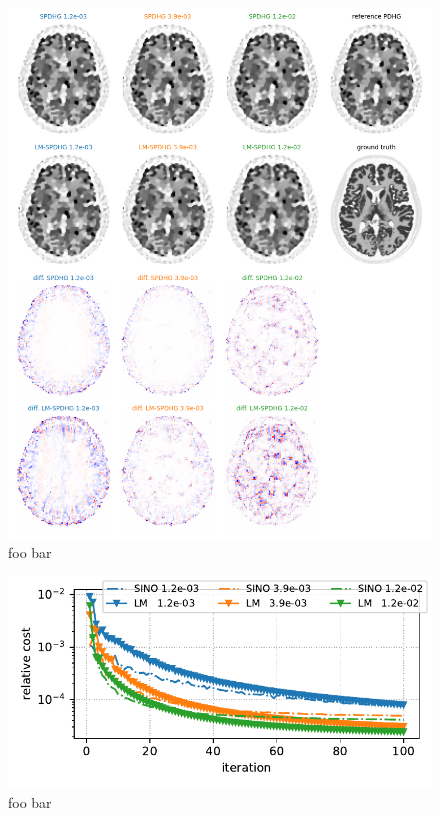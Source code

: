 \documentclass{IEEEtran}
\begin{document}
\begin{figure}[t]
\centerline{\includegraphics[width=1.0\columnwidth]{./figs/brain2d_counts_1.0E+06_beta_2.0E-03_niter_10000_100_nsub_56_precond_False.png}}
\caption{foo bar}
\label{fig:recons}
\end{figure}

\begin{figure}[t]
\centerline{\includegraphics[width=0.8\columnwidth]{./figs/brain2d_counts_1.0E+06_beta_2.0E-03_niter_10000_100_nsub_56_precond_False_metrics.pdf}}
\caption{foo bar}
\label{fig:cost}
\end{figure}
\end{document}
